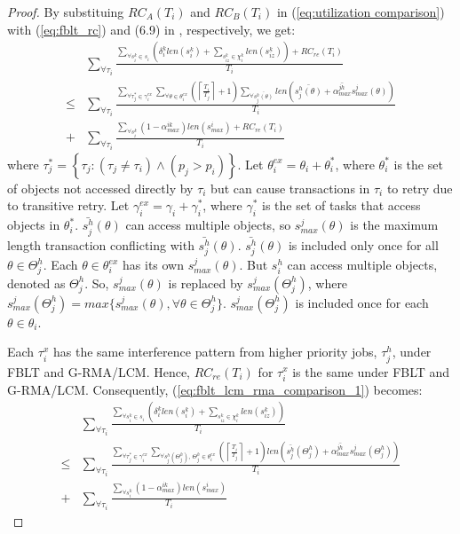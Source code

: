 \documentclass[a4paper,english]{article}
\newtheorem{proof}{Proof}
\begin{document}
\begin{proof}\normalfont

By substituing $RC_{A}(T_{i})$ and $RC_{B}(T_{i})$ in (\ref{eq:utilization comparison})
with (\ref{eq:fblt_rc}) and (6.9) in \cite{shambake_phd_proposal}, respectively, we get:
\begin{eqnarray}
 & \sum_{\forall\tau_{i}}\frac{\sum_{\forall s_{i}^{k}\in s_{i}}\left(\delta_i^klen(s_{i}^{k})+\sum_{s_{iz}^{k}\in\chi_{i}^{k}}len(s_{iz}^{k})\right)+RC_{re}(T_{i})}{T_{i}}\label{eq:fblt_lcm_rma_comparison_1}\\
\le & \sum_{\forall\tau_{i}}\frac{\sum_{\forall\tau_{j}^{*}\in\gamma_{i}^{ex}}\sum_{\forall\theta\in\theta_{i}^{ex}}\left(\left\lceil \frac{T_{i}}{T_{j}}\right\rceil +1\right)\sum_{\forall\bar{s_{j}^{h}(\theta)}}len\left(\bar{s_{j}^{h}(\theta)}+\bar{\alpha_{max}^{jh}}s_{max}^{j}(\theta)\right)}{T_{i}}\nonumber \\
+ & \sum_{\forall\tau_{i}}\frac{\sum_{\forall s_{i}^{k}}\left(1-\alpha_{max}^{ik}\right)len(s_{max}^{i})+RC_{re}(T_{i})}{T_{i}}\nonumber 
\end{eqnarray}
where $\tau_{j}^{*}=\left\{ \tau_{j}:\left(\tau_{j}\ne\tau_{i}\right)\wedge\left(p_{j}>p_{i}\right)\right\} $.
Let $\theta_{i}^{ex}=\theta_{i}+\theta_{i}^{*}$, where $\theta_{i}^{*}$
is the set of objects not accessed directly by $\tau_{i}$ but can
cause transactions in $\tau_{i}$ to retry due to transitive retry.
Let $\gamma_{i}^{ex}=\gamma_{i}+\gamma_{i}^{*}$, where $\gamma_{i}^{*}$
is the set of tasks that access objects in $\theta_{i}^{*}$. $\bar{s_{j}^{h}}(\theta)$
can access multiple objects, so $s_{max}^{j}(\theta)$ is the maximum
length transaction conflicting with $\bar{s_{j}^{h}}(\theta)$. $\bar{s_{j}^{h}}(\theta)$ is included only once for all $\theta \in \Theta_j^h$. Each $\theta \in \theta_i^{ex}$ has its own $s_{max}^j(\theta)$. But $s_i^h$ can access multiple objects, denoted as $\Theta_j^h$. So, $s_{max}^j(\theta)$ is replaced by $s_{max}^j(\Theta_j^h)$, where $s_{max}^j(\Theta_j^h)=max\{s_{max}^j(\theta),\forall \theta \in \Theta_j^h\}$. $s_{max}^j(\Theta_j^h)$ is included once for each $\theta \in \theta_i$. 


Each $\tau_i^x$ has the same interference pattern from higher priority jobs, $\tau_j^h$, under FBLT and G-RMA/LCM. Hence, $RC_{re}(T_i)$ for $\tau_i^x$ is the same under FBLT and G-RMA/LCM. Consequently, (\ref{eq:fblt_lcm_rma_comparison_1}) becomes: 
\begin{eqnarray}
 & \sum_{\forall\tau_{i}}\frac{\sum_{\forall s_{i}^{k}\in s_{i}}\left(\delta_i^klen(s_{i}^{k})+\sum_{s_{iz}^{k}\in\chi_{i}^{k}}len(s_{iz}^{k})\right)}{T_{i}}\label{eq:fblt_lcm_rma_comparison_2}\\
\le & \sum_{\forall\tau_{i}}\frac{\sum_{\forall\tau_{j}^{*}\in\gamma_{i}^{ex}}\sum_
{\forall s_j^h(\Theta_j^h),\,\Theta_j^h\in\theta_{i}^{ex}}\left(\left\lceil \frac{T_{i}}{T_{j}}\right\rceil +1\right)len\left(\bar{s_{j}^{h}}(\Theta_j^h)+\bar{\alpha_{max}^{jh}}s_{max}^{j}(\Theta_j^h)\right)}{T_{i}}\nonumber \\
+ & \sum_{\forall\tau_{i}}\frac{\sum_{\forall s_{i}^{k}}\left(1-\alpha_{max}^{ik}\right)len(s_{max}^{i})}{T_{i}}\nonumber 
\end{eqnarray}


\end{proof}
\end{document}
